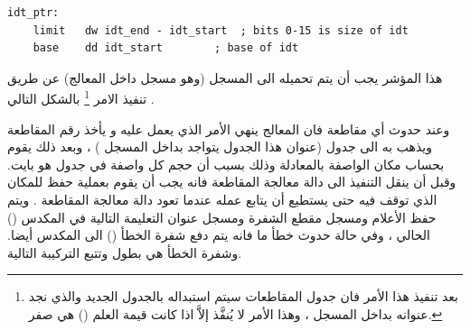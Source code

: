 \documentclass[document.tex]{subfiles}
\begin{document}
\begin{english}

\lstset{numberstyle=\tiny,numbers=left,stepnumber=1,numbersep=5pt,tabsize=2,extendedchars=true,breaklines=true,frame=b,showspaces=false, showtabs=false,xleftmargin=10pt,framexleftmargin=10pt,framexrightmargin=5pt,framexbottommargin=4pt,showstringspaces=false,language=[x86masm]Assembler}


\begin{lstlisting}[label=idt_ptr,caption=\en{Value to put in IDTR}]
idt_ptr:
	limit	dw idt_end - idt_start	; bits 0-15 is size of idt
	base	dd idt_start		; base of idt
\end{lstlisting}
\end{english}

هذا المؤشر يجب أن يتم تحميله الى المسجل  (وهو مسجل داخل المعالج) عن طريق تنفيذ الامر \footnote{بعد تنفيذ هذا الأمر فان جدول المقاطعات سيتم استبداله بالجدول الجديد والذي نجد عنوانه بداخل المسجل  ، وهذا الأمر لا يُنفَّذ إلاَّ  اذا كانت قيمة العلم () هي صفر.} بالشكل التالي .

وعند حدوث أي مقاطعة فان المعالج ينهي الأمر الذي يعمل عليه و يأخذ رقم المقاطعة ويذهب به الى جدول  (عنوان هذا الجدول يتواجد بداخل المسجل ) ، وبعد ذلك يقوم بحساب مكان الواصفة بالمعادلة  وذلك بسبب أن حجم كل واصفة في جدول  هو  بايت. وقبل أن ينقل التنفيذ الى دالة معالجة المقاطعة فانه يجب أن يقوم بعملية حفظ للمكان الذي توقف فيه حتى يستطيع أن يتابع عمله عندما تعود دالة معالجة المقاطعة . ويتم حفظ الأعلام  ومسجل مقطع الشفرة  ومسجل عنوان التعليمة التالية  في المكدس ()  الحالي ، وفي حالة حدوث خطأ ما فانه يتم دفع شفرة الخطأ () الى المكدس أيضا. وشفرة الخطأ هي بطول  وتتبع التركيبة التالية.
\end{document}
